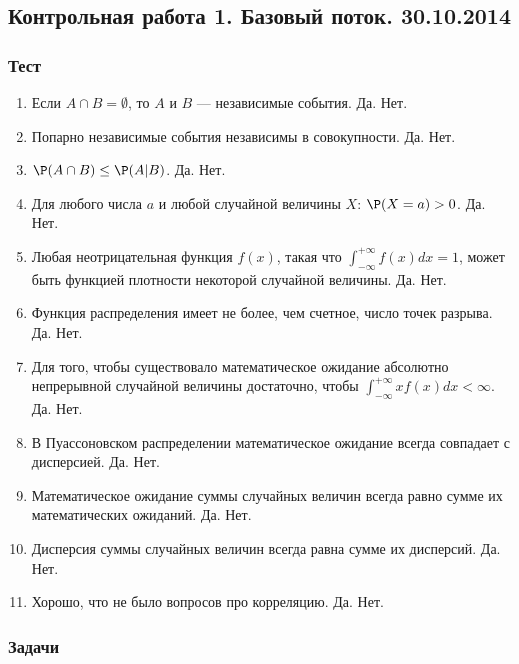\subsection{Контрольная работа 1. Базовый поток. 30.10.2014}
\subsubsection*{Тест}

\begin{enumerate}

\item Если $A \cap B = \emptyset$, то $A$ и $B$ — независимые события. Да. Нет.

\item Попарно независимые события независимы в совокупности. Да. Нет.

\item $\P(A \cap B) \le \P(A|B)$. Да. Нет.

\item Для любого числа $a$ и любой случайной величины $X$: $\P(X=a)>0$. Да. Нет.

\item Любая неотрицательная функция $f(x)$, такая что $\int_{-\infty}^{+\infty} f(x) dx = 1$, может быть функцией плотности некоторой случайной величины. Да. Нет.

\item Функция распределения имеет не более, чем счетное, число точек разрыва. Да. Нет.

\item Для того, чтобы существовало математическое ожидание абсолютно непрерывной случайной величины достаточно, чтобы $\int_{-\infty}^{+\infty} x f(x) dx < \infty$. Да. Нет.

\item В Пуассоновском распределении математическое ожидание всегда совпадает с дисперсией.	Да. Нет.

\item Математическое ожидание суммы случайных величин всегда равно сумме их математических ожиданий.	Да. Нет.

\item Дисперсия суммы случайных величин всегда равна сумме их дисперсий.	Да. Нет.

\item Хорошо, что не было вопросов про корреляцию.	Да. Нет.

\end{enumerate}

\subsubsection*{Задачи}

